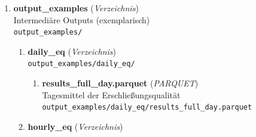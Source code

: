 \begin{enumerate}[label=A\arabic*, ref=A\arabic*, leftmargin=*, itemsep=0.5em, topsep=0.3em]
\begin{enumerate}[label=A\arabic{enumi}-\arabic*, ref=A\arabic{enumi}-\arabic*, leftmargin=*, itemsep=0.5em, topsep=0.3em]
\begin{enumerate}[label=A\arabic{enumi}-\arabic{enumii}-\arabic*, ref=A\arabic{enumi}-\arabic{enumii}-\arabic*, leftmargin=*, itemsep=0.5em, topsep=0.3em]
Kategorisierte POI der erweiterten Funktionen inklusive Gehzeiten zu nächstem ZO-Kandidaten
\edef\appendixlabelkey{app:A\arabic{enumi}-\arabic{enumii}-\arabic{enumiii}}
\expandafter\label\expandafter{\appendixlabelkey}
\item \textbf{poi\_flex\_tt\_15} \textnormal{(\textit{Layer})}\\
Kategorisierte POI der Basisfunktionen inklusive Gehzeiten zu nächstem ZO-Kandidaten
\edef\appendixlabelkey{app:A\arabic{enumi}-\arabic{enumii}-\arabic{enumiii}}
\expandafter\label\expandafter{\appendixlabelkey}
\item \textbf{areas\_flex\_catcount} \textnormal{(\textit{Layer})}\\
kategorisierte Dichteflächen mit Zählung der POI-Kategorien
\edef\appendixlabelkey{app:A\arabic{enumi}-\arabic{enumii}-\arabic{enumiii}}
\expandafter\label\expandafter{\appendixlabelkey}
\end{enumerate}
\end{enumerate}
\item \textbf{output\_examples} \textnormal{(\textit{Verzeichnis})}\\
Intermediäre Outputs (exemplarisch)\\
\texttt{\small output\_examples/}
\edef\appendixlabelkey{app:A\arabic{enumi}}
\expandafter\label\expandafter{\appendixlabelkey}
\begin{enumerate}[label=A\arabic{enumi}-\arabic*, ref=A\arabic{enumi}-\arabic*, leftmargin=*, itemsep=0.5em, topsep=0.3em]
\item \textbf{daily\_eq} \textnormal{(\textit{Verzeichnis})}\\
\texttt{\small output\_examples/daily\_eq/}
\edef\appendixlabelkey{app:A\arabic{enumi}-\arabic{enumii}}
\expandafter\label\expandafter{\appendixlabelkey}
\begin{enumerate}[label=A\arabic{enumi}-\arabic{enumii}-\arabic*, ref=A\arabic{enumi}-\arabic{enumii}-\arabic*, leftmargin=*, itemsep=0.5em, topsep=0.3em]
\item \textbf{results\_full\_day.parquet} \textnormal{(\textit{PARQUET})}\\
Tagesmittel der Erschließungsqualität\\
\texttt{\small output\_examples/daily\_eq/results\_full\_day.parquet}
\edef\appendixlabelkey{app:A\arabic{enumi}-\arabic{enumii}-\arabic{enumiii}}
\expandafter\label\expandafter{\appendixlabelkey}
\end{enumerate}
\item \textbf{hourly\_eq} \textnormal{(\textit{Verzeichnis})}\\

\end{enumerate}
\end{enumerate}
